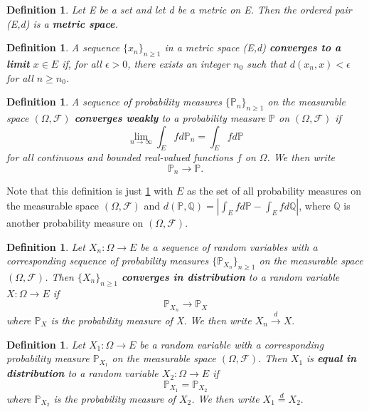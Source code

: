 \documentclass[honours,12pt]{UNSWthesis}
\newcommand{\PP}{\mathbb{P}}
\newcommand{\1}{\mathbf 1}
\newcommand{\FF}{\mathcal{F}}
\newtheorem{definition}[theorem]{Definition}
\numberwithin{equation}{section}
\theoremstyle{definition}
\theoremstyle{remark}
\begin{document}
\begin{definition}
Let E be a set and let d be a metric on E. Then the ordered pair (E,d) is a \textbf{metric space}.\\
\end{definition}

\begin{definition}\label{def:metricConvergence}
A sequence $\{x_n\}_{n\geq1}$ in a metric space (E,d) \textbf{converges to a limit} $x\in E$ if, for all $\epsilon>0$, there exists an integer $n_0$ such that $d(x_n,x)<\epsilon$ for all $n\geq n_0$.\\
\end{definition}

\begin{definition}
A sequence of probability measures $\{\PP_n\}_{n \geq 1}$ on the measurable space $(\Omega, \FF)$ \textbf{converges weakly} to a probability measure $\PP$ on $(\Omega, \FF)$ if
\[
\lim_{n\rightarrow \infty} \int_E fd\PP_n = \int_Efd\PP
\]
for all continuous and bounded real-valued functions $f$ on $\Omega$. We then write \[\PP_n\rightarrow\PP.\]
\end{definition}
\noindent Note that this definition is just \ref{def:metricConvergence} with $E$ as the set of all probability measures on the measurable space $(\Omega, \FF)$ and $d(\PP,\mathbb{Q})=|\int_Efd\PP- \int_Efd\mathbb{Q}|$, where $\mathbb{Q}$ is another probability measure on $(\Omega, \FF).$\\

\begin{definition}
Let $X_n:\Omega\to E$ be a sequence of random variables with a corresponding sequence of probability measures $\{\PP_{X_n}\}_{n\geq 1}$ on the measurable space $(\Omega, \FF)$. Then $\{X_n\}_{n\geq 1}$ \textbf{converges in distribution} to a random variable $X:\Omega\to E$ if 
\[\PP_{X_n} \to \PP_X \] where $\PP_X$ is the probability measure of X. We then write $X_n \overset{d}{\to}X.$\\
\end{definition}

\begin{definition}\label{def:equalDist}
Let $X_1:\Omega\to E$ be a  random variable with a corresponding probability measure $\PP_{X_1}$ on the measurable space $(\Omega, \FF)$. Then $X_1$ is \textbf{equal in distribution} to a random variable $X_2:\Omega\to E$ if 
\[\PP_{X_1} = \PP_{X_2} \] where $\PP_{X_2}$ is the probability measure of $X_2$. We then write $X_1 \overset{d}{=}X_2.$\\
\end{definition}
\end{document}
